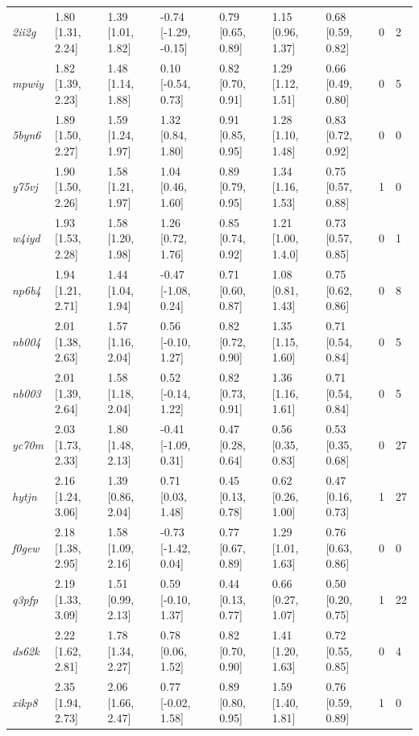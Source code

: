 \documentclass[9pt,lineno,final]{elife}
\begin{document}
\begin{table}[tb!]
\begin{center}
\begin{threeparttable}
\begin{tabular}{@{}lllllllll@{}}
\textit{2ii2g} & 1.80 [1.31, 2.24] & 1.39 [1.01, 1.82] & -0.74 [-1.29, -0.15] & 0.79 [0.65, 0.89] & 1.15 [0.96, 1.37] & 0.68 [0.59, 0.82] & 0 & 2 \\
\textit{mpwiy} & 1.82 [1.39, 2.23] & 1.48 [1.14, 1.88] & 0.10 [-0.54, 0.73] & 0.82 [0.70, 0.91] & 1.29 [1.12, 1.51] & 0.66 [0.49, 0.80] & 0 & 5 \\
\textit{5byn6} & 1.89 [1.50, 2.27] & 1.59 [1.24, 1.97] & 1.32 [0.84, 1.80] & 0.91 [0.85, 0.95] & 1.28 [1.10, 1.48] & 0.83 [0.72, 0.92] & 0 & 0 \\
\textit{y75vj} & 1.90 [1.50, 2.26] & 1.58 [1.21, 1.97] & 1.04 [0.46, 1.60] & 0.89 [0.79, 0.95] & 1.34 [1.16, 1.53] & 0.75 [0.57, 0.88] & 1 & 0 \\
\textit{w4iyd} & 1.93 [1.53, 2.28] & 1.58 [1.20, 1.98] & 1.26 [0.72, 1.76] & 0.85 [0.74, 0.92] & 1.21 [1.00, 1.4.0] & 0.73 [0.57, 0.85] & 0 & 1 \\
\textit{np6b4} & 1.94 [1.21, 2.71] & 1.44 [1.04, 1.94] & -0.47 [-1.08, 0.24] & 0.71 [0.60, 0.87] & 1.08 [0.81, 1.43] & 0.75 [0.62, 0.86] & 0 & 8 \\
\textit{nb004} & 2.01 [1.38, 2.63] & 1.57 [1.16, 2.04] & 0.56 [-0.10, 1.27] & 0.82 [0.72, 0.90] & 1.35 [1.15, 1.60] & 0.71 [0.54, 0.84] & 0 & 5 \\
\textit{nb003} & 2.01 [1.39, 2.64] & 1.58 [1.18, 2.04] & 0.52 [-0.14, 1.22] & 0.82 [0.73, 0.91] & 1.36 [1.16, 1.61] & 0.71 [0.54, 0.84] & 0 & 5 \\
\textit{yc70m} & 2.03 [1.73, 2.33] & 1.80 [1.48, 2.13] & -0.41 [-1.09, 0.31] & 0.47 [0.28, 0.64] & 0.56 [0.35, 0.83] & 0.53 [0.35, 0.68] & 0 & 27 \\
\textit{hytjn} & 2.16 [1.24, 3.06] & 1.39 [0.86, 2.04] & 0.71 [0.03, 1.48] & 0.45 [0.13, 0.78] & 0.62 [0.26, 1.00] & 0.47 [0.16, 0.73] & 1 & 27 \\
\textit{f0gew} & 2.18 [1.38, 2.95] & 1.58 [1.09, 2.16] & -0.73 [-1.42, 0.04] & 0.77 [0.67, 0.89] & 1.29 [1.01, 1.63] & 0.76 [0.63, 0.86] & 0 & 0 \\
\textit{q3pfp} & 2.19 [1.33, 3.09] & 1.51 [0.99, 2.13] & 0.59 [-0.10, 1.37] & 0.44 [0.13, 0.77] & 0.66 [0.27, 1.07] & 0.50 [0.20, 0.75] & 1 & 22 \\
\textit{ds62k} & 2.22 [1.62, 2.81] & 1.78 [1.34, 2.27] & 0.78 [0.06, 1.52] & 0.82 [0.70, 0.90] & 1.41 [1.20, 1.63] & 0.72 [0.55, 0.85] & 0 & 4 \\
\textit{xikp8} & 2.35 [1.94, 2.73] & 2.06 [1.66, 2.47] & 0.77 [-0.02, 1.58] & 0.89 [0.80, 0.95] & 1.59 [1.40, 1.81] & 0.76 [0.59, 0.89] & 1 & 0 \\

\end{tabular}
\end{threeparttable}
\end{center}
\end{table}
\end{document}

